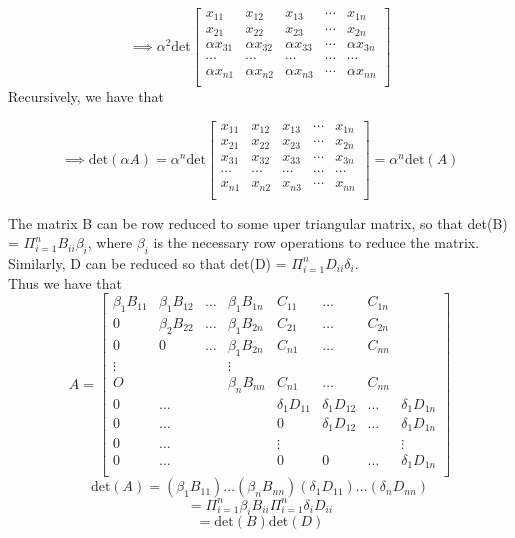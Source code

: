 \documentclass[letterpaper,12pt]{article}
\theoremstyle{definition}
\begin{document}
\[
\implies
\alpha^2 \text{det}
\begin{bmatrix}
     x_{11} & x_{12} &x_{13} & \cdots &x_{1n} \\
    x_{21} &x_{22} & x_{23} & \cdots &x_{2n} \\
   \alpha x_{31} &\alpha x_{32} &\alpha x_{33} & \cdots &\alpha x_{3n} \\
    \cdots&\cdots&\cdots &\cdots &\cdots\\
   \alpha x_{n1} &\alpha x_{n2} &\alpha x_{n3} & \cdots &\alpha x_{nn} \\
\end{bmatrix}
\]
Recursively, we have that

\[\implies \text{det}(\alpha A)  = 
\alpha^n \text{det}
\begin{bmatrix}
    x_{11} & x_{12} & x_{13} & \cdots & x_{1n} \\
    x_{21} & x_{22} & x_{23} & \cdots & x_{2n} \\
    x_{31} & x_{32} & x_{33} & \cdots & x_{3n} \\
    \cdots&\cdots&\cdots &\cdots &\cdots\\
    x_{n1} & x_{n2} & x_{n3} & \cdots & x_{nn} \\
\end{bmatrix}
=
\alpha^n \text{det}(A)
\]

The matrix B can be row reduced to some uper triangular matrix, so that det(B) = $\Pi^n_{i=1} B_{ii} \beta _i$, where $\beta _i$ is the necessary row operations
to reduce the matrix. Similarly, D can be reduced so that det(D) =  $\Pi^n_{i=1} D_{ii} \delta _i$.\\
Thus we have that 
\[
A = \begin{bmatrix}
    \beta _1 B_{11} & \beta _1 B_{12} & \dots & \beta_1 B_{1n} & C_{11} & \dots & C_{1n}\\
    0 & \beta _2 B_{22} & \dots & \beta_1 B_{2n} & C_{21} & \dots & C_{2n} \\
    0 & 0 & \dots & \beta_1 B_{2n} & C_{n1} & \dots & C_{nn} \\
    \vdots & & & \vdots & &&\\
    O &&& \beta_n B_{nn} & C_{n1} & \dots & C_{nn} \\
    0&\dots&&& \delta _1 D_{11} & \delta _1 D_{12} & \dots & \delta_1 D_{1n} \\
    0&\dots&&& 0 & \delta _1 D_{12} & \dots & \delta_1 D_{1n} \\
    0&\dots&&& \vdots &  &  & \vdots \\
    0&\dots&&& 0 & 0 & \dots & \delta_1 D_{1n} \\
\end{bmatrix}
\]
\[\text{det}(A) = (\beta_1 B_{11})\dots(\beta_n B_{nn})(\delta_1 D_{11})\dots(\delta_n D_{nn})\]
\[ = \Pi_{i=1}^n \beta_i B_{ii} \Pi_{i=1}^n \delta_i D_{ii} \]
\[ = \text{det}(B)\text{det}(D)\]
\end{document}
